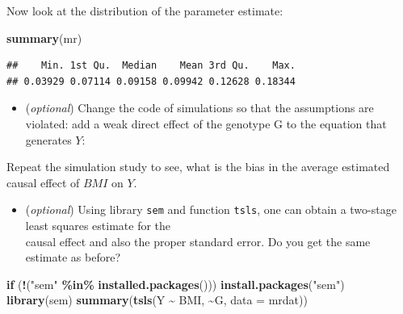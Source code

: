 \documentclass[
]{book}
\newenvironment{Shaded}{\begin{snugshade}}{\end{snugshade}}
\newcommand{\AttributeTok}[1]{\textcolor[rgb]{0.13,0.29,0.53}{#1}}
\newcommand{\ControlFlowTok}[1]{\textcolor[rgb]{0.13,0.29,0.53}{\textbf{#1}}}
\newcommand{\DecValTok}[1]{\textcolor[rgb]{0.00,0.00,0.81}{#1}}
\newcommand{\FloatTok}[1]{\textcolor[rgb]{0.00,0.00,0.81}{#1}}
\newcommand{\FunctionTok}[1]{\textcolor[rgb]{0.13,0.29,0.53}{\textbf{#1}}}
\newcommand{\NormalTok}[1]{#1}
\newcommand{\OtherTok}[1]{\textcolor[rgb]{0.56,0.35,0.01}{#1}}
\newcommand{\SpecialCharTok}[1]{\textcolor[rgb]{0.81,0.36,0.00}{\textbf{#1}}}
\newcommand{\StringTok}[1]{\textcolor[rgb]{0.31,0.60,0.02}{#1}}
\providecommand{\tightlist}{%
  \setlength{\itemsep}{0pt}\setlength{\parskip}{0pt}}
\theoremstyle{definition}
\theoremstyle{definition}
\theoremstyle{definition}
\theoremstyle{definition}
\theoremstyle{remark}
\begin{document}
Now look at the distribution of the parameter estimate:

\begin{Shaded}
\begin{Highlighting}[]
\FunctionTok{summary}\NormalTok{(mr)}
\end{Highlighting}
\end{Shaded}

\begin{verbatim}
##    Min. 1st Qu.  Median    Mean 3rd Qu.    Max. 
## 0.03929 0.07114 0.09158 0.09942 0.12628 0.18344
\end{verbatim}

\begin{itemize}
\tightlist
\item
  (\emph{optional}) Change the code of simulations so that the assumptions are violated: add a weak direct effect of the genotype G to the equation that generates \(Y\):
\end{itemize}

\begin{Shaded}
\end{Shaded}

Repeat the simulation study to see, what is the bias in the average estimated causal effect of \(BMI\) on \(Y\).

\begin{itemize}
\tightlist
\item
  (\emph{optional}) Using library \texttt{sem} and function \texttt{tsls}, one can obtain a two-stage least squares estimate for the\\
  causal effect and also the proper standard error. Do you get the same estimate as before?
\end{itemize}

\begin{Shaded}
\begin{Highlighting}[]
\ControlFlowTok{if}\NormalTok{ (}\SpecialCharTok{!}\NormalTok{(}\StringTok{"sem"} \SpecialCharTok{\%in\%} \FunctionTok{installed.packages}\NormalTok{())) }\FunctionTok{install.packages}\NormalTok{(}\StringTok{"sem"}\NormalTok{)}
\FunctionTok{library}\NormalTok{(sem)}
\FunctionTok{summary}\NormalTok{(}\FunctionTok{tsls}\NormalTok{(Y }\SpecialCharTok{\textasciitilde{}}\NormalTok{ BMI, }\SpecialCharTok{\textasciitilde{}}\NormalTok{G, }\AttributeTok{data =}\NormalTok{ mrdat))}
\end{Highlighting}
\end{Shaded}
\end{document}
